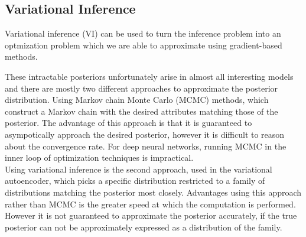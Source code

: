 

\subsection{Variational Inference}
Variational inference (VI) can be used to turn the inference problem into an optmization problem which we are able to approximate using gradient-based methods.

These intractable posteriors unfortunately arise in almost all interesting models and there are mostly two different approaches to approximate the posterior distribution.
Using Markov chain Monte Carlo (MCMC) methods, which construct a Markov chain with the desired attributes matching those of the posterior. The advantage of this approach is that it is guaranteed to asympotically approach the desired posterior, however it is difficult to reason about the convergence rate. For deep neural networks, running MCMC in the inner loop of optimization techniques is impractical.\\
Using variational inference is the second approach, used in the variational autoencoder, which picks a specific distribution restricted to a family of distributions matching the posterior most closely.
Advantages using this approach rather than MCMC is the greater speed at which the computation is performed.
However it is not guaranteed to approximate the posterior accurately, if the true posterior can not be approximately expressed as a distribution of the family.

